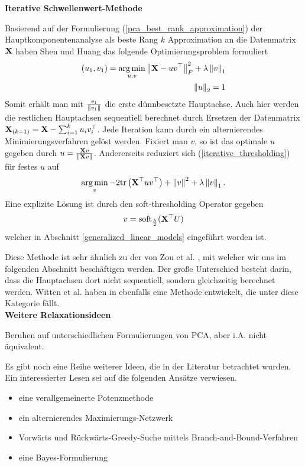 \textbf{Iterative Schwellenwert-Methode}

Basierend auf der Formulierung (\ref{pca_best_rank_approximation}) der Hauptkomponentenanalyse als beste Rang $k$ Approximation an die Datenmatrix $\mathbf{X}$ haben Shen und Huang \cite{shen} das folgende Optimierungsproblem formuliert
\begin{align}
\label{iterative_thresholding}
\begin{split}
(u_1, v_1) = \operatorname*{arg\,min}_{u, v} \left\lVert \mathbf{X} - u v^{\top} \right\rVert_{F}^{2}  + \lambda \left\lVert v \right\rVert_{1}\\
\left\lVert u \right\rVert_2 = 1
\end{split}
\end{align}
Somit erhält man mit $\frac{v_1}{\left\lVert v_1 \right\rVert}$ die erste dünnbesetzte Hauptachse. Auch hier werden die restlichen Hauptachsen sequentiell berechnet durch Ersetzen der Datenmatrix $\mathbf{X}_{(k+1)} = \mathbf{X} - \sum_{i=1}^k u_iv_i^{\top}$. Jede Iteration kann durch ein alternierendes Minimierungsverfahren gelöst werden. Fixiert man $v$, so ist das optimale $u$ gegeben durch $u = \frac{\mathbf{X}v}{\left\lVert \mathbf{X}v \right\rVert}$. Andererseits reduziert sich (\ref{iterative_thresholding}) für festes $u$ auf
$$\operatorname*{arg\,min}_{v} -2\text{tr} \left( \mathbf{X}^{\top}uv^{\top} \right) + \left\lVert v \right\rVert^{2} + \lambda \left\lVert v \right\rVert_1.$$
Eine explizite Lösung ist durch den soft-thresholding Operator gegeben
$$v = \operatorname{soft}_{\frac{\lambda}{2}}(\mathbf{X}^{\top} U)$$
welcher in Abschnitt \ref{generalized_linear_models} eingeführt worden ist.

Diese Methode ist sehr ähnlich zu der von Zou et al. \cite{zou_sparsepca} , mit welcher wir uns im folgenden Abschnitt beschäftigen werden. Der große Unterschied besteht darin, dass die Hauptachsen dort nicht sequentiell, sondern gleichzeitig berechnet werden. Witten et al. haben in \cite{witten} ebenfalls eine Methode entwickelt, die unter diese Kategorie fällt.\\

\textbf{Weitere Relaxationsideen}

Beruhen auf unterschiedlichen Formulierungen von PCA, aber i.A. nicht äquivalent.

Es gibt noch eine Reihe weiterer Ideen, die in der Literatur betrachtet wurden. Ein interessierter Lesen sei auf die folgenden Ansätze verwiesen.
\begin{itemize}
\item eine verallgemeinerte Potenzmethode \cite{journee}
\item ein alternierendes Maximierungs-Netzwerk \cite{richtarik}
\item Vorwärts und Rückwärts-Greedy-Suche mittels Branch-and-Bound-Verfahren \cite{moghaddam}
\item eine Bayes-Formulierung \cite{guan}
\end{itemize}


